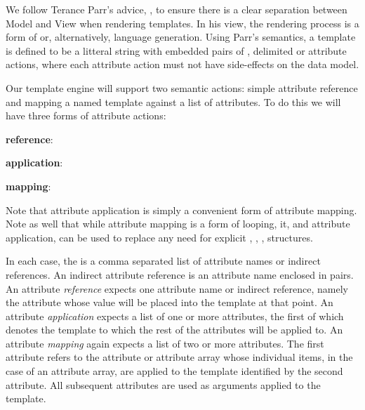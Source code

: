 
\startchapter[title=The Lua Rendering Engine]

We follow Terance Parr's advice, \cite{parr2004templateMVC}, to ensure 
there is a clear separation between Model and View when rendering 
templates. In his view, the rendering process is a form of 
 or, alternatively, language generation. Using Parr's 
 semantics, a template is defined to be a litteral string with 
embedded pairs of \quote{\{\{}, \quote{\}\}} delimited  or 
attribute actions, where each attribute action must not have side-effects 
on the data model. 

Our template engine will support two semantic actions: simple attribute 
reference and mapping a named template against a list of attributes. To do 
this we will have three forms of attribute actions: 

\startitemize
\item {\bf reference}:  

\item {\bf application}: 

\item {\bf mapping}: 

\stopitemize

Note that attribute application is simply a convenient form of attribute 
mapping. Note as well that while attribute mapping is a form of  
 looping, it, and attribute application, can be used to replace 
any need for explicit , , ,  
structures. 

In each case, the  is a comma separated list of 
attribute names or indirect references. An indirect attribute reference is 
an attribute name enclosed in \quote{\[} \quote{\]} pairs. An attribute 
\emph{reference} expects one attribute name or indirect reference, namely 
the attribute whose value will be placed into the template  at 
that point. An attribute \emph{application} expects a list of one or more 
attributes, the first of which denotes the template to which the rest of 
the attributes will be applied to. An attribute \emph{mapping} again 
expects a list of two or more attributes. The first attribute refers to 
the attribute or attribute array whose individual items, in the case of an 
attribute array, are applied to the template identified by the second 
attribute. All subsequent attributes are used as arguments applied to the 
template. 

